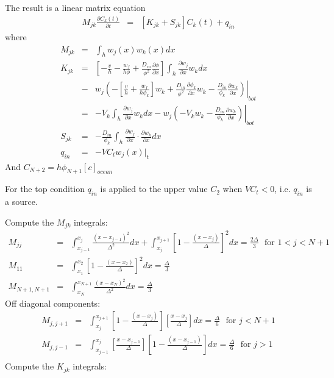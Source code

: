 The result is a linear matrix equation
\begin{eqnarray}
M_{jk}\frac{\partial C_k(t)}{\partial t} & = & [K_{jk}+S_{jk}] C_k(t) + q_{in}
\end{eqnarray}
where
\begin{eqnarray}
M_{jk} & = & \int_h w_j(x)w_k(x)dx \nonumber \\
K_{jk} & = & \left[-\frac{v}{h} - \frac{w_f}{h\phi}+ \frac{D_{in}}{\phi^2}\frac{\partial
      \phi}{\partial x}\right]\int_h \frac{\partial w_j}{\partial x}
  w_k dx \nonumber \\
&-&
\left. w_j\left(-\left[\frac{v}{h} + \frac{w_f}{h\phi_k}\right]w_k +
    \frac{D_{in}}{\phi^2}\frac{\partial \phi_k}{\partial x} w_k - \frac{D_{in}}{\phi_k}\frac{\partial w_k}{\partial
      x}\right)\right|_{bot} \nonumber \\
& = & -V_k\int_h \frac{\partial w_j}{\partial x} w_k dx -
\left. w_j\left(-V_kw_k - \frac{D_{in}}{\phi_k}\frac{\partial w_k}{\partial
      x}\right)\right|_{bot} \nonumber \\
S_{jk} & = & -\frac{D_{in}}{\phi_k}\int_h \frac{\partial w_j}{\partial x} \cdot
\frac{\partial w_k}{\partial x}dx \nonumber \\
q_{in} & = & -V C_{t} w_j(x)|_{t}
\end{eqnarray}
 And $C_{N+2} = h\phi_{N+1}[c]_{ocean}$

For the top condition $q_{in}$ is applied to the upper value $C_2$
when $VC_t < 0$, i.e. $q_{in}$ is a source.

Compute the $M_{jk}$ integrals:
\begin{eqnarray}
M_{jj} & = & \int_{x_{j-1}}^{x_j}\frac{(x- x_{j-1})^2}{\Delta^2}dx +
\int_{x_{j}}^{x_{j+1}}\left[ 1-\frac{(x- x_{j})}{\Delta}\right]^2dx =
\frac{2\Delta}{3} \ \ \ \mbox{for }1 < j < N+1 \nonumber \\
M_{11} & = & \int_{x_{1}}^{x_{2}}\left[ 1-\frac{(x- x_{2})}{\Delta}\right]^2dx =
\frac{\Delta}{3}   \nonumber \\
M_{N+1,N+1} & = &\int_{x_{N}}^{x_{N+1}}\frac{(x- x_{N})^2}{\Delta^2}dx
= \frac{\Delta}{3} \nonumber
\end{eqnarray}
Off diagonal components:
\begin{eqnarray}
M_{j,j+1} & = &  \int_{x_{j}}^{x_{j+1}}\left[1 - \frac{(x-
    x_{j})}{\Delta}\right]\left[ \frac{x-x_{j}}{\Delta}\right]dx =
\frac{\Delta}{6} \ \ \ \mbox{for }j < N+1 \nonumber \\
M_{j,j-1} & = &  \int_{x_{j-1}}^{x_{j}}\left[ \frac{x-x_{j-1}}{\Delta}\right]\left[1 - \frac{(x-
    x_{j-1})}{\Delta}\right]dx =
\frac{\Delta}{6} \ \ \ \mbox{for }j > 1 \nonumber \\
\end{eqnarray}
Compute the $K_{jk}$ integrals:


